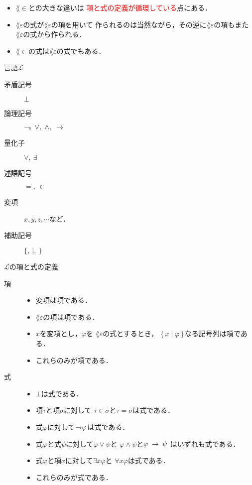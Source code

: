 	\begin{itemize}
	\setlength{\itemsep}{10pt}
		\item $\lang{\in}$との大きな違いは
		 \textcolor{red}{項と式の定義が循環している}点にある．
		
		\item$\lang{\varepsilon}$の式が$\lang{\varepsilon}$の項を用いて
			作られるのは当然ながら，その逆に$\lang{\varepsilon}$の項もまた
			$\lang{\varepsilon}$の式から作られる．
			
		\item $\lang{\in}$の式は$\lang{\varepsilon}$の式でもある．
	\end{itemize}
	
\newpage
	\begin{itembox}[l]{言語$\mathcal{L}$}
		\begin{description}
			\item[矛盾記号] $\bot$
			\item[論理記号] $\negation,\ \vee,\ \wedge,\ \rarrow$
			\item[量化子] $\forall,\ \exists$
			\item[述語記号] $=,\ \in$
			\item[変項] $x,y,z,\cdots$など．
			\item[補助記号] $\{,\ |,\ \}$
		\end{description}
	\end{itembox}
	
	\begin{itembox}[l]{$\mathcal{L}$の項と式の定義}
		\begin{description}
			\item[項] 
				\begin{itemize}
					\item 変項は項である．
					\item $\lang{\varepsilon}$の項は項である．
					\item $x$を変項とし，$\varphi$を
						$\lang{\varepsilon}$の式とするとき，
						$\left\{\, x \mid \varphi\, \right\}$なる記号列は項である．
					\item これらのみが項である．
				\end{itemize}
			
			\item[式] 
				\begin{itemize}
					\item $\bot$は式である．
					\item 項$\tau$と項$\sigma$に対して
						$\tau \in \sigma$と$\tau = \sigma$は式である．
					\item 式$\varphi$に対して$\rightharpoondown\hspace{-0.25em} \varphi$は式である．
					\item 式$\varphi$と式$\psi$に対して$\varphi \vee \psi$と
						$\varphi \wedge \psi$と$\varphi \hspace{0.25em}\rightarrow\hspace{0.25em} \psi$
						はいずれも式である．
					\item 式$\varphi$と項$x$に対して$\exists x \varphi$と
						$\forall x \varphi$は式である．
					\item これらのみが式である．
				\end{itemize}
		\end{description}
	\end{itembox}
